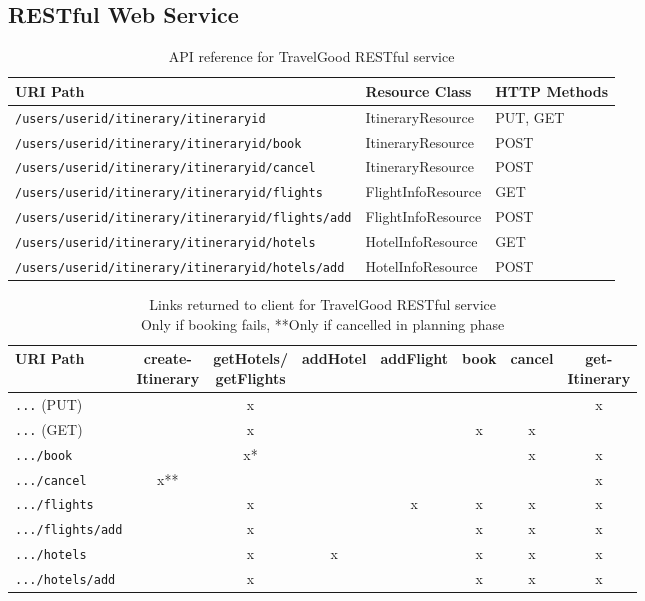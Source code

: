 \subsection{RESTful Web Service}

\begin{table}[h]
\begin{tabular}{|l|l|l|} \hline
\textbf{URI Path} & \textbf{Resource Class} & \textbf{HTTP Methods} \\ \hline
\texttt{/users/{userid}/itinerary/{itineraryid}} & ItineraryResource & PUT, GET \\ \hline
\texttt{/users/{userid}/itinerary/{itineraryid}/book} & ItineraryResource & POST \\ \hline
\texttt{/users/{userid}/itinerary/{itineraryid}/cancel} & ItineraryResource & POST \\ \hline
\texttt{/users/{userid}/itinerary/{itineraryid}/flights} & FlightInfoResource & GET \\ \hline
\texttt{/users/{userid}/itinerary/{itineraryid}/flights/add} & FlightInfoResource & POST \\ \hline
\texttt{/users/{userid}/itinerary/{itineraryid}/hotels} & HotelInfoResource & GET \\ \hline
\texttt{/users/{userid}/itinerary/{itineraryid}/hotels/add} & HotelInfoResource & POST \\ \hline
\end{tabular}
\caption{API reference for TravelGood RESTful service}
\label{TableAPIref}
\end{table}

\begin{table} [h]
\begin{tabular}{|l|c|c|c|c|c|c|c|} \hline
URI Path & \shortstack{create- \\ Itinerary} & \shortstack{getHotels/ \\ getFlights} & addHotel & addFlight & book & cancel & \shortstack{get- \\ Itinerary}\\ \hline
\texttt{...} (PUT) 			&	&x	&	&	&	&	&x\\ \hline
\texttt{...} (GET) 			&	&x	&	&	&x	&x	&\\ \hline
\texttt{.../book} 			&	&x*	&	&	&	&x	&x\\ \hline
\texttt{.../cancel} 		&x**&	&	&	&	&	&x\\ \hline
\texttt{.../flights}		&	&x	&	&x	&x	&x	&x\\ \hline
\texttt{.../flights/add} 	&	&x	&	&	&x	&x	&x\\ \hline
\texttt{.../hotels }		&	&x	&x	&	&x	&x	&x\\ \hline
\texttt{.../hotels/add} 	&	&x	&	&	&x	&x	&x\\ \hline
\end{tabular}\\
\captionsetup{justification=centering}
\caption{Links returned to client for TravelGood RESTful service \\ \footnotesize *Only if booking fails, **Only if cancelled in planning phase}
\label{TableLinks}
\end{table}

